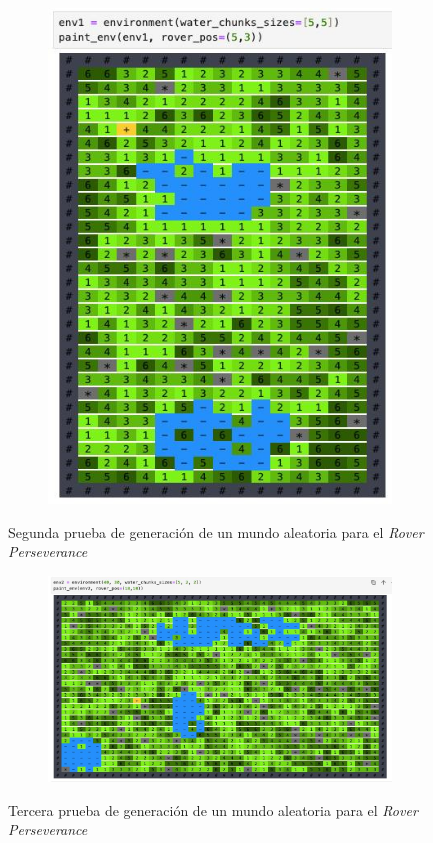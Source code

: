 \documentclass[12pt, letterpaper]{article}
\begin{document}
    \begin{figure}[h!]
        \centering
        \begin{subfigure}[h!]{0.45\textwidth}
            \centering
            \includegraphics[scale=0.25,angle=0]{env1.jpeg}
        \end{subfigure}
        \hfill
        \centering
        \caption{Segunda prueba de generación de un mundo aleatoria para el \textit{Rover Perseverance}}
        \label{env1}
    \end{figure}

    \begin{figure}[h!]
        \centering
        \begin{subfigure}[h!]{0.45\textwidth}
            \centering
            \includegraphics[scale=0.16,angle=0]{env2.jpeg}
        \end{subfigure}
        \hfill
        \centering
        \caption{Tercera prueba de generación de un mundo aleatoria para el \textit{Rover Perseverance}}
        \label{env2}
    \end{figure}
\end{document}
